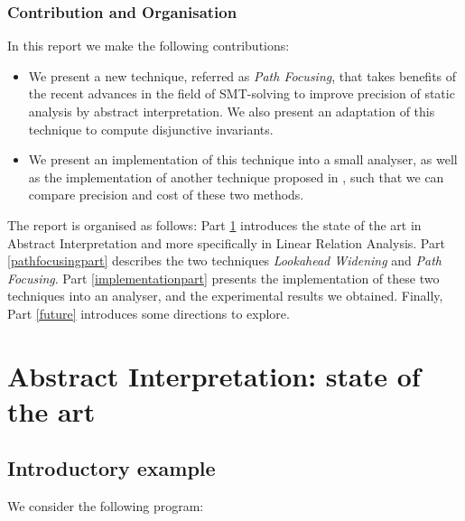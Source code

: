 \documentclass[a4paper,english,titlepage,11pt]{report}
\begin{document}
\subsection*{Contribution and Organisation}

In this report we make the following contributions:
\begin{itemize}
\item We present a new technique, referred as \emph{Path Focusing}, that takes
benefits of the recent advances in the field of SMT-solving to improve precision
of static analysis by abstract interpretation. We also present an adaptation of
this technique to compute disjunctive invariants.
\item We present an implementation of this technique into a small analyser, as
well as the implementation of another technique proposed in \cite{GopanR06},
such that we can compare precision and cost of these two methods.
\end{itemize}

The report is organised as follows:
Part \ref{stateoftheartpart} introduces the state of the art in Abstract
Interpretation and more specifically in Linear Relation Analysis.
Part \ref{pathfocusingpart} describes the two techniques
\emph{Lookahead Widening} and \emph{Path Focusing}.
Part \ref{implementationpart} presents the implementation of these two
techniques into an analyser, and the experimental results we obtained.
Finally, Part \ref{future} introduces some directions to explore.

\chapter{Abstract Interpretation: state of the art}
\label{stateoftheartpart}

\section{Introductory example}

We consider the following program:
\end{document}
